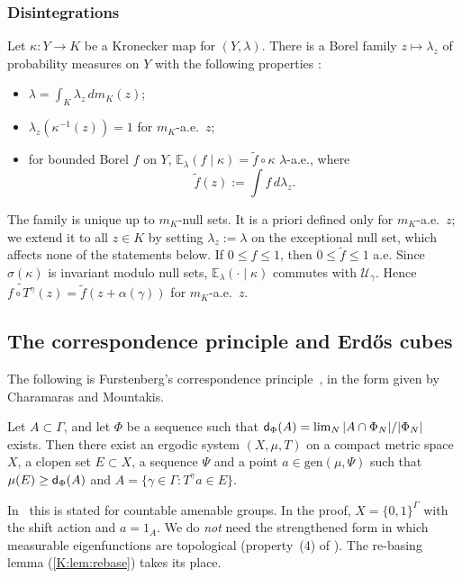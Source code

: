 \subsubsection*{Disintegrations}
Let $\kappa\colon Y\to K$ be a Kronecker map for $(Y,\lambda)$.
There is a Borel family $z\mapsto\lambda_z$ of probability measures on $Y$ with the following
properties \cite[Theorem~2.2 and (2.1)]{charamaras2024finding}:
\begin{itemize}
\item $\lambda=\int_K\lambda_z\,dm_K(z)$;
\item $\lambda_z(\kappa^{-1}(z))=1$ for $m_K$-a.e.\ $z$;
\item for bounded Borel $f$ on $Y$,
$\mathbb E_\lambda(f\mid\kappa)=\tilde f\circ\kappa$ $\lambda$-a.e., where
\[
\tilde f(z):=\int f\,d\lambda_z .
\]
\end{itemize}
The family is unique up to $m_K$-null sets. It is a priori defined only for $m_K$-a.e.\
$z$; we extend it to all $z\in K$ by setting $\lambda_z:=\lambda$ on the exceptional null
set, which affects none of the statements below.
If $0\le f\le 1$, then $0\le\tilde f\le1$ a.e.
Since $\sigma(\kappa)$ is invariant modulo null sets, $\mathbb E_\lambda(\cdot\mid\kappa)$
commutes with $\mathcal U_\gamma$. Hence $\widetilde{f\circ T^\gamma}(z)=\tilde f(z+\alpha(\gamma))$
for $m_K$-a.e.\ $z$.

\subsection{The correspondence principle and Erdős cubes}\label{K:ssec:corr}

The following is Furstenberg's correspondence principle~\cite{furstenberg1977ergodic}, in the
form given by Charamaras and Mountakis.

\begin{theorem}\label{K:thm:corr}
Let $A\subset\Gamma$, and let $\Phi$ be a \Fol{} sequence such that
$\mathsf{d}_\Phi(A)=\lim_N|A\cap\Phi_N|/|\Phi_N|$ exists.
Then there exist an ergodic system $(X,\mu,T)$ on a compact metric space $X$, a clopen set
$E\subset X$, a \Fol{} sequence $\Psi$ and a point $a\in\mathrm{gen}(\mu,\Psi)$ such that
$\mu(E)\ge\mathsf{d}_\Phi(A)$ and $A=\{\gamma\in\Gamma:T^\gamma a\in E\}$.
\end{theorem}

In~\cite{charamaras2024finding} this is stated for countable amenable groups. In the proof,
$X=\{0,1\}^\Gamma$ with the shift action and $a=1_A$.
We do \emph{not} need the strengthened form in which measurable eigenfunctions are
topological (property~(4) of \cite[Theorem~2.5]{kra2026short}). The re-basing lemma
(\cref{K:lem:rebase}) takes its place.

